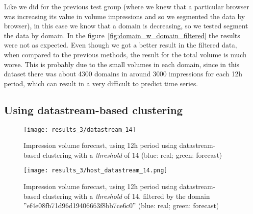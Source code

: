 Like we did for the previous test group (where we knew that a particular browser
was increasing its value in volume impressions and so we segmented the data by
browser),
in this case we know that a domain is decreasing, so we tested segment the data
by domain. In the figure~\ref{fig:domain_w_domain_filtered} the results were
not as expected. Even though we got a better result in the filtered data, when
compared to the previous methods, the result for the total volume is
much worse. This is probably due to the small volumes in each domain, since in this
dataset there was about 4300 domains in around 3000 impressions for each 12h
period,
which can result in a very difficult to predict time series.


\subsection*{Using datastream-based clustering}

\begin{figure}[!ht]
\centering
\begin{minipage}[t]{0.45\linewidth}
\texttt{[image: results\_3/datastream\_14]} 
\caption[Volume
impression forecast, domain, cluster by datastream]{Impression volume
forecast, using 12h period using datastream-based clustering with a
\emph{threshold} of 14 (blue: real; green: forecast)}
\label{fig:domain_w_datastream}

\end{minipage}
\quad
\begin{minipage}[t]{0.45\linewidth}
\texttt{[image: results\_3/host\_datastream\_14.png]} 
\caption[Volume
impression forecast, domain, cluster by datastream, filtered]{Impression volume
forecast, using 12h period using datastream-based clustering with a
\emph{threshold} of 14, filtered by the domain ''ef4e08fb71d96d19406663f8bb7ce6c0'' (blue: real; green: forecast)}
\label{fig:domain_w_datastream_filtered}

\end{minipage}

\end{figure}

